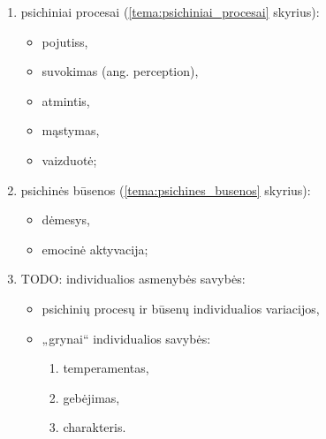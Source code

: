 \begin{enumerate}
  \item psichiniai procesai (\ref{tema:psichiniai_procesai} skyrius):
    \begin{itemize}
      \item \glspl{pojutis},
      \item suvokimas (ang. perception),
      \item atmintis,
      \item mąstymas,
      \item vaizduotė;
    \end{itemize}
  \item psichinės būsenos (\ref{tema:psichines_busenos} skyrius):
    \begin{itemize}
      \item dėmesys,
      \item emocinė aktyvacija;
    \end{itemize}
  \item TODO: individualios asmenybės savybės:
    \begin{itemize}
      \item psichinių procesų ir būsenų individualios variacijos,
      \item „grynai“ individualios savybės:
        \begin{enumerate}
          \item temperamentas,
          \item gebėjimas,
          \item charakteris.
        \end{enumerate}
    \end{itemize}
\end{enumerate}
